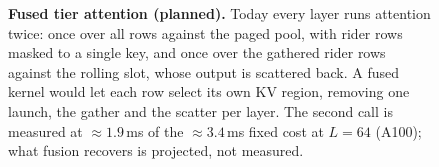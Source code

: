 \begin{figure}[t]
\caption{\textbf{Fused tier attention (planned).} Today every layer runs attention
twice: once over all rows against the paged pool, with rider rows masked to a
single key, and once over the gathered rider rows against the rolling slot, whose
output is scattered back. A fused kernel would let each row select its own KV
region, removing one launch, the gather and the scatter per layer. The second call
is measured at ${\approx}1.9$\,ms of the ${\approx}3.4$\,ms fixed cost at $L{=}64$
(A100); what fusion recovers is projected, not measured.
}
\label{fig:fused}
\end{figure}
